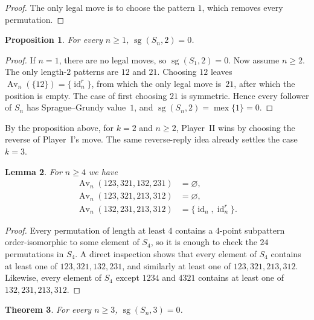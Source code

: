 \documentclass[11pt]{amsart}
\newcommand{\Sym}{S}
\newcommand{\Av}{\operatorname{Av}}
\newcommand{\mex}{\operatorname{mex}}
\newcommand{\sg}{\operatorname{sg}}
\newcommand{\id}{\operatorname{id}}
\theoremstyle{plain}
\newtheorem{theorem}{Theorem}[section]
\newtheorem{proposition}[theorem]{Proposition}
\newtheorem{lemma}[theorem]{Lemma}
\theoremstyle{definition}
\theoremstyle{remark}
\begin{document}
\begin{proof}
  The only legal move is to choose the pattern $1$, which removes every permutation.
\end{proof}

\begin{proposition}
  For every $n \geq 1$, $\sg(\Sym_n,2)=0$.
\end{proposition}

\begin{proof}
  If $n=1$, there are no legal moves, so $\sg(\Sym_1,2)=0$.  Now assume $n \geq 2$.
  The only length-$2$ patterns are $12$ and $21$.  Choosing $12$ leaves $\Av_n(\{12\})=\{\id_n^r\}$,
  from which the only legal move is~$21$, after which the position is empty. The case of first choosing
  $21$ is symmetric.  Hence every follower
  of $\Sym_n$ has Sprague--Grundy value~$1$, and $\sg(\Sym_n,2)=\mex\{1\}=0$.
\end{proof}

By the proposition above, for $k=2$ and $n \geq 2$, Player~II wins by choosing the reverse of
Player~I's move.  The same reverse-reply idea already settles the case $k=3$.

\begin{lemma}\label{lem:k3-avoidance}
  For $n \geq 4$ we have
  \begin{align*}
    \Av_n(123,321,132,231) & = \varnothing,       \\
    \Av_n(123,321,213,312) & = \varnothing,       \\
    \Av_n(132,231,213,312) & = \{\id_n,\id_n^r\}.
  \end{align*}
\end{lemma}

\begin{proof}
  Every permutation of length at least $4$ contains a $4$-point subpattern order-isomorphic to some
  element of $\Sym_4$, so it is enough to check the $24$ permutations in $\Sym_4$.  A direct inspection shows that every element of $\Sym_4$
  contains at least one of $123,321,132,231$, and similarly at least one of $123,321,213,312$.
  Likewise, every element of $\Sym_4$ except $1234$ and $4321$ contains at least one of
  $132,231,213,312$.
\end{proof}

\begin{theorem}\label{thm:k3}
  For every $n \geq 3$, $\sg(\Sym_n,3)=0$.
\end{theorem}
\end{document}
